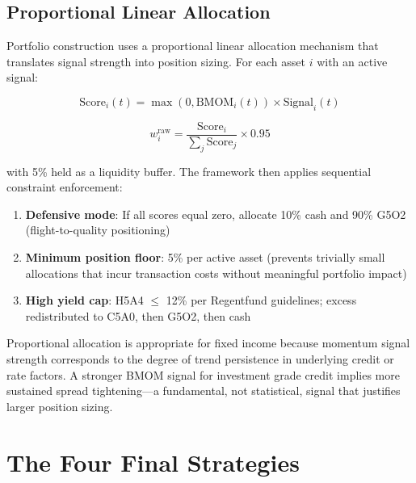 \documentclass[11pt]{article}
\begin{document}
\subsection{Proportional Linear Allocation}

Portfolio construction uses a proportional linear allocation mechanism that translates signal strength into position sizing. For each asset $i$ with an active signal:

\begin{equation}
\text{Score}_i(t) = \max(0, \text{BMOM}_i(t)) \times \text{Signal}_i(t)
\end{equation}

\begin{equation}
w_i^{\text{raw}} = \frac{\text{Score}_i}{\sum_j \text{Score}_j} \times 0.95
\end{equation}

with 5\% held as a liquidity buffer. The framework then applies sequential constraint enforcement:

\begin{enumerate}
    \item \textbf{Defensive mode}: If all scores equal zero, allocate 10\% cash and 90\% G5O2 (flight-to-quality positioning)

    \item \textbf{Minimum position floor}: 5\% per active asset (prevents trivially small allocations that incur transaction costs without meaningful portfolio impact)

    \item \textbf{High yield cap}: H5A4 $\leq$ 12\% per Regentfund guidelines; excess redistributed to C5A0, then G5O2, then cash
\end{enumerate}

Proportional allocation is appropriate for fixed income because momentum signal strength corresponds to the degree of trend persistence in underlying credit or rate factors. A stronger BMOM signal for investment grade credit implies more sustained spread tightening---a fundamental, not statistical, signal that justifies larger position sizing.

\section{The Four Final Strategies}
\end{document}
